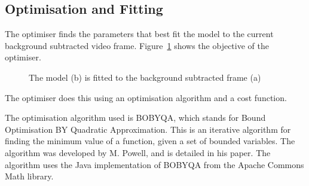 \pagebreak
\subsection{Optimisation and Fitting}

The optimiser finds the parameters that best fit the model to the current background subtracted video frame. Figure~\ref{fig:modelfit} shows the objective of the optimiser.

\begin{figure}[H]
    \centering
\caption{The model (b) is fitted to the background subtracted frame (a)}
\label{fig:modelfit}
\end{figure}

The optimiser does this using an optimisation algorithm and a cost function.

The optimisation algorithm used is BOBYQA, which stands for Bound Optimisation BY Quadratic Approximation. This is an iterative algorithm for finding the minimum value of a function, given a set of bounded variables. The algorithm was developed by M. Powell, and is detailed in his paper\cite{bobyqa}. The algorithm uses the Java implementation of BOBYQA from the Apache Commons Math library\cite{apachemath}.

